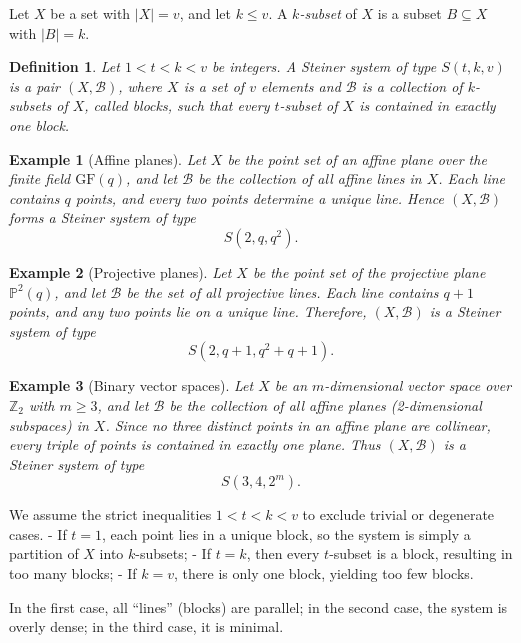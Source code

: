 \documentclass[12pt,a4paper,openany]{book}
\newtheorem{definition}{Definition}[section]
\newtheorem{example}{Example}[section]
\newcommand{\GF}{\mathrm{GF}}
\newcommand{\Z}{\mathbb{Z}}
\newcommand{\PP}{\mathbb{P}}
\begin{document}
Let $X$ be a set with $|X| = v$, and let $k \leq v$. A \emph{$k$-subset} of $X$ is a subset $B \subseteq X$ with $|B| = k$.

\begin{definition}
Let $1 < t < k < v$ be integers. A \emph{Steiner system} of type $S(t, k, v)$ is a pair $(X, \mathscr{B})$, where $X$ is a set of $v$ elements and $\mathscr{B}$ is a collection of $k$-subsets of $X$, called \emph{blocks}, such that every $t$-subset of $X$ is contained in exactly one block.
\end{definition}

\begin{example}[Affine planes]
Let $X$ be the point set of an affine plane over the finite field $\GF(q)$, and let $\mathscr{B}$ be the collection of all affine lines in $X$. Each line contains $q$ points, and every two points determine a unique line. Hence $(X, \mathscr{B})$ forms a Steiner system of type
\[
S(2, q, q^2).
\]
\end{example}

\begin{example}[Projective planes]
Let $X$ be the point set of the projective plane $\PP^2(q)$, and let $\mathscr{B}$ be the set of all projective lines. Each line contains $q+1$ points, and any two points lie on a unique line. Therefore, $(X, \mathscr{B})$ is a Steiner system of type
\[
S(2, q+1, q^2+q+1).
\]
\end{example}

\begin{example}[Binary vector spaces]
Let $X$ be an $m$-dimensional vector space over $\Z_2$ with $m \ge 3$, and let $\mathscr{B}$ be the collection of all affine planes (2-dimensional subspaces) in $X$. Since no three distinct points in an affine plane are collinear, every triple of points is contained in exactly one plane. Thus $(X, \mathscr{B})$ is a Steiner system of type
\[
S(3, 4, 2^m).
\]
\end{example}

We assume the strict inequalities $1 < t < k < v$ to exclude trivial or degenerate cases.  
- If $t = 1$, each point lies in a unique block, so the system is simply a partition of $X$ into $k$-subsets;  
- If $t = k$, then every $t$-subset is a block, resulting in too many blocks;  
- If $k = v$, there is only one block, yielding too few blocks.  

In the first case, all ``lines'' (blocks) are parallel; in the second case, the system is overly dense; in the third case, it is minimal.
\end{document}
